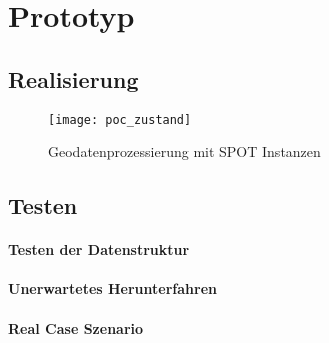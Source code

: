 \section{Prototyp}


\subsection{Realisierung}

\begin{figure}[H]
	\centering
	\texttt{[image: poc\_zustand]}
	\caption{Geodatenprozessierung mit SPOT Instanzen}
	\label{fig:ist_zustand}
\end{figure}

\subsection{Testen}

\paragraph{Testen der Datenstruktur}


\paragraph{Unerwartetes Herunterfahren}


\paragraph{Real Case Szenario}
